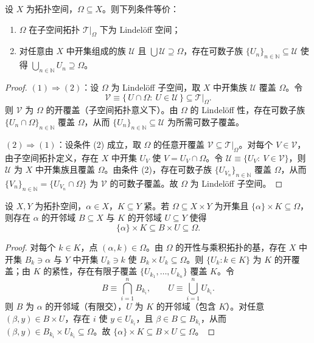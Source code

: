 \documentclass[lang=cn,a4paper,newtx,figureplace=section,tableplace=section]{elegantbook}
\begin{document}
 \begin{proposition}\label{prop:lindeloff-subspace}
  设 $X$ 为拓扑空间，$\Omega\subseteq X$。则下列条件等价：
  \begin{enumerate}
    \item $\Omega$ 在子空间拓扑 $\mathcal T|_\Omega$ 下为 Lindelöff 空间；
    \item 对任意由 $X$ 中开集组成的族 $\mathcal U$ 且 $\bigcup \mathcal U\supseteq\Omega$，存在可数子族 $\{U_n\}_{n\in\mathbb N}\subseteq\mathcal U$ 使得 $\bigcup_{n\in\mathbb N} U_n\supseteq\Omega$。
  \end{enumerate}
 \end{proposition}
 \begin{proof}
  $(1)\Rightarrow(2)$：设 $\Omega$ 为 Lindelöff 子空间，取 $X$ 中开集族 $\mathcal U$ 覆盖 $\Omega$。令
  \[
   \mathcal V\equiv\{\,U\cap\Omega:\ U\in\mathcal U\,\}\subseteq\mathcal T|_\Omega.
  \]
  则 $\mathcal V$ 为 $\Omega$ 的开覆盖（子空间拓扑意义下）。由 $\Omega$ 的 Lindelöff 性，存在可数子族 $\{U_n\cap\Omega\}_{n\in\mathbb N}$ 覆盖 $\Omega$，从而 $\{U_n\}_{n\in\mathbb N}\subseteq\mathcal U$ 为所需可数子覆盖。
  
  $(2)\Rightarrow(1)$：设条件 (2) 成立，取 $\Omega$ 的任意开覆盖 $\mathcal V\subseteq\mathcal T|_\Omega$。对每个 $V\in\mathcal V$，由子空间拓扑定义，存在 $X$ 中开集 $U_V$ 使 $V=U_V\cap\Omega$。令 $\mathcal U\equiv\{U_V:\ V\in\mathcal V\}$，则 $\mathcal U$ 为 $X$ 中开集族且覆盖 $\Omega$。由条件 (2)，存在可数子族 $\{U_{V_n}\}_{n\in\mathbb N}$ 覆盖 $\Omega$，从而 $\{V_n\}_{n\in\mathbb N}=\{U_{V_n}\cap\Omega\}$ 为 $\mathcal V$ 的可数子覆盖。故 $\Omega$ 为 Lindelöff 子空间。
 \end{proof}
 
 \begin{lemma}[管状邻域引理]\label{lem:tube-lemma}
  设 $X,Y$ 为拓扑空间，$\alpha\in X$，$K\subseteq Y$ 紧。若 $\Omega\subseteq X\times Y$ 为开集且 $\{\alpha\}\times K\subseteq\Omega$，则存在 $\alpha$ 的开邻域 $B\subseteq X$ 与 $K$ 的开邻域 $U\subseteq Y$ 使得
  \[
   \{\alpha\}\times K\subseteq B\times U\subseteq\Omega.
  \]
 \end{lemma}
 \begin{proof}
  对每个 $k\in K$，点 $(\alpha,k)\in\Omega$。由 $\Omega$ 的开性与乘积拓扑的基，存在 $X$ 中开集 $B_k\ni\alpha$ 与 $Y$ 中开集 $U_k\ni k$ 使 $B_k\times U_k\subseteq\Omega$。则 $\{U_k:k\in K\}$ 为 $K$ 的开覆盖；由 $K$ 的紧性，存在有限子覆盖 $\{U_{k_1},\dots,U_{k_n}\}$ 覆盖 $K$。令
  \[
   B\equiv\bigcap_{i=1}^n B_{k_i},\qquad U\equiv\bigcup_{i=1}^n U_{k_i}.
  \]
  则 $B$ 为 $\alpha$ 的开邻域（有限交），$U$ 为 $K$ 的开邻域（包含 $K$）。对任意 $(\beta,y)\in B\times U$，存在 $i$ 使 $y\in U_{k_i}$，且 $\beta\in B\subseteq B_{k_i}$，从而 $(\beta,y)\in B_{k_i}\times U_{k_i}\subseteq\Omega$。故 $\{\alpha\}\times K\subseteq B\times U\subseteq\Omega$。
  \end{proof}
  
\end{document}
